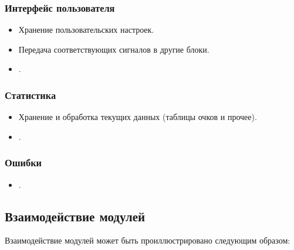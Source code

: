 \documentclass[12pt,a4paper,fullpage]{article}
\begin{document}
\subsubsection{Интерфейс пользователя}
\begin{itemize}
	\item Хранение пользовательских настроек.
	\item Передача соответствующих сигналов в другие блоки.
	\item .\\
\end{itemize}

\subsubsection{Статистика}
\begin{itemize}
	\item Хранение и обработка текущих данных (таблицы очков и прочее).
	\item .\\
\end{itemize}

\subsubsection{Ошибки}
\begin{itemize}
	\item .\\
\end{itemize}


\subsection{Взаимодействие модулей}
Взаимодействие модулей может быть проиллюстрировано следующим образом:\\
\end{document}
